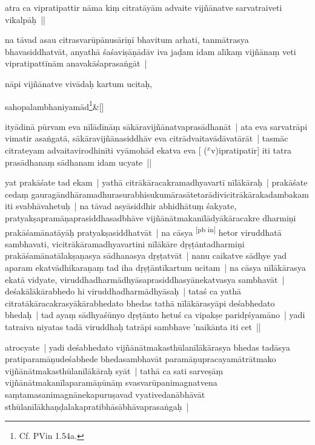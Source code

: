\documentclass[article,a4paper]{memoir}
\newcommand{\corr}[1]{($^{x}$#1)}
\begin{document}
	  \pstart atra ca vipratipattir nā\-ma kiṃ citratā\-yā\-m advaite vijñā\-natve sarvatraiveti vikalpā\-ḥ || 
	\pend
      

	  \pstart na tā\-vad asau citrasvarū\-pā\-nusā\-riṇī\- bhavitum arhati, tanmā\-trasya bhavasiddhatvā\-t, anyathā\- śaśaviṣā\-ṇā\-dā\-v iva jaḍam idam alī\-kaṃ vijñā\-naṃ veti vipratipattī\-nā\-m anavakā\-śaprasaṅgā\-t |
	\pend
      

	  \pstart nā\-pi vijñā\-natve vivā\-daḥ kartum ucitaḥ,
	\pend
      
	    
	    \stanza[\smallbreak]
sahopalambhaniyamā\-d\footnote{Cf. PVin 1.54a.}\&[\smallbreak]


	

	  \pstart ityā\-dinā\- pū\-rvam eva nī\-lā\-dī\-nā\-ṃ sā\-kā\-ravijñā\-natvaprasā\-dhanā\-t | ata eva sarvatrā\-pi vimatir asaṅgatā\-, sā\-kā\-ravijñā\-nasiddhā\-v eva citrā\-dvaitavā\-dā\-vatā\-rā\-t | tasmā\-c citrateyam advaitavirodhinī\-ti vyā\-mohā\-d ekatva eva [ {\corr vipratipatir}] iti tatra prasā\-dhanaṃ sā\-dhanam idam ucyate ||
	\pend
      

	  \pstart yat prakā\-śate tad ekam | yathā\- citrā\-kā\-racakramadhyavartī\- nī\-lā\-kā\-raḥ | prakā\-śate cedaṃ gauragā\-ndhā\-ramadhurasurabhisukumā\-rasā\-tetarā\-divicitrā\-kā\-rakadambakam iti svabhā\-vahetuḥ | \label{thakur75-129.25} na tā\-vad asyā\-siddhir abhidhā\-tuṃ śakyate, pratyakṣapramā\-ṇaprasiddhasadbhā\-ve vijñā\-nā\-tmakanī\-lā\-dyā\-kā\-racakre dharmiṇi prakā\-śamā\-natā\-yā\-ḥ pratyakṣasiddhatvā\-t | na cā\-sya \leavevmode\textsuperscript{\rmlatinfont\tiny [pb in]}\label{thakur75-130} hetor viruddhatā\- sambhavati, vicitrā\-kā\-ramadhyavartini nī\-lā\-kā\-re dṛṣṭā\-ntadharmiṇi prakā\-śamā\-natā\-lakṣaṇasya sā\-dhanasya dṛṣṭatvā\-t | nanu caikatve sā\-dhye yad aparam ekatvā\-dhikaraṇaṃ tad iha dṛṣṭā\-ntī\-kartum ucitam | na cā\-sya nī\-lā\-kā\-rasya ekatā\- vidyate, viruddhadharmā\-dhyā\-saprasiddhasyā\-nekatvasya sambhavā\-t | deśakā\-lā\-kā\-rabhedo hi viruddhadharmā\-dhyā\-saḥ | tataś ca yathā\- citratā\-kā\-racakrasyā\-kā\-rabhedato bhedas tathā\- nī\-lā\-kā\-rasyā\-pi deśabhedato bhedaḥ | tad ayaṃ sā\-dhyaśū\-nyo dṛṣṭā\-nto hetuś ca vipakṣe paridṛśyamā\-no | yadi tatraiva niyatas tadā\- viruddhaḥ \label{thakur75-130.8} tatrā\-pi sambhave 'naikā\-nta iti cet ||
	\pend
      

	  \pstart atrocyate | yadi deśabhedato vijñā\-nā\-tmakasthū\-lanī\-lā\-kā\-rasya bhedas tadā\-sya pratiparamā\-ṇudeśabhede bhedasambhavā\-t paramā\-ṇupracayamā\-trā\-tmako vijñā\-nā\-tmakasthū\-lanī\-lā\-kā\-raḥ syā\-t | tathā\- ca sati sarveṣā\-ṃ vijñā\-nā\-tmakanī\-laparamā\-ṇū\-nā\-ṃ svasvarū\-panimagnatvena saṃtamasanimagnā\-nekapuruṣavad vyativedanā\-bhā\-vā\-t sthū\-lanī\-lā\-khaṇḍalakapratibhā\-sā\-bhā\-vaprasaṅgaḥ |
	\pend
      
\end{document}

